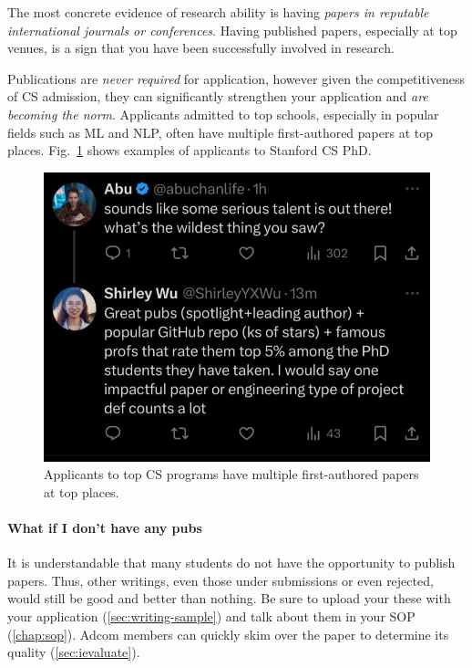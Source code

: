 \documentclass[oneside,11pt,dvipsnames]{book}
\begin{document}
The most concrete evidence of research ability is having \emph{papers in reputable international journals or conferences}.
Having published papers, especially at top venues, is a sign that you have been successfully involved in research. 

Publications are \emph{never required} for application, however given the competitiveness of CS admission, they can significantly strengthen your application and \emph{are becoming the norm}. Applicants admitted to top schools, especially in popular fields such as ML and NLP, often have multiple first-authored papers at top places. Fig.~\ref{fig:wu} shows examples of applicants to Stanford CS PhD.

\begin{figure}
\begin{center}
    \includegraphics[scale=0.3]{files/wu.jpeg}
\end{center}
\caption{Applicants to top CS programs have multiple first-authored papers at top places.}\label{fig:wu}
\end{figure}  


\paragraph{What if I don't have any pubs} It is understandable that many students do not have the opportunity to publish papers. Thus, other writings, even those under submissions or even rejected, would still be good and better than nothing. 
Be sure to upload your these with your application (\autoref{sec:writing-sample}) and talk about them in your SOP (\autoref{chap:sop}). Adcom members can quickly skim over the paper to determine its quality (\autoref{sec:ievaluate}).
\end{document}

